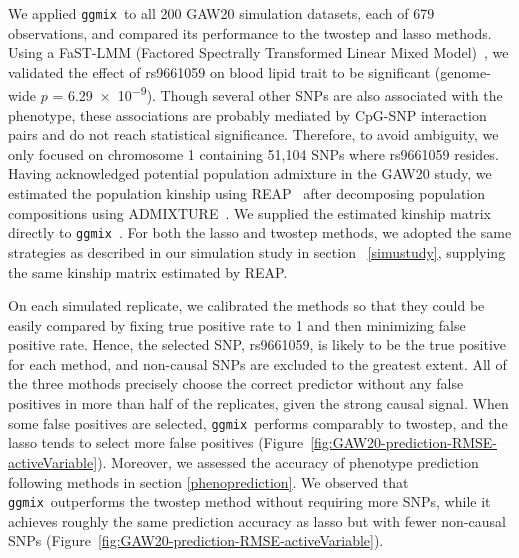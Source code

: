 \documentclass[12pt,letter]{article}\usepackage[]{graphicx}\usepackage[]{color}
\newcommand{\ggmix}{\texttt{ggmix}}
\begin{document}
We applied \ggmix ~to all 200 GAW20 simulation datasets, each of 679 observations, and compared its performance to the twostep and lasso methods.
Using a FaST-LMM (Factored Spectrally Transformed Linear Mixed Model)~\citep{howey2018application}, we validated the effect of rs9661059 on blood lipid trait to be significant (genome-wide $p$ = \num{6.29e-9}).
Though several other SNPs are also associated with the phenotype, these associations are probably mediated by CpG-SNP interaction pairs and do not reach statistical significance.
Therefore, to avoid ambiguity, we only focused on chromosome 1 containing 51,104 SNPs where rs9661059 resides.
Having acknowledged potential population admixture in the GAW20 study, we estimated the population kinship using REAP~\citep{thornton2012estimating} after decomposing population compositions using ADMIXTURE~\citep{alexander2009fast}. We supplied the estimated kinship matrix directly to \ggmix~.
For both the lasso and twostep methods, we adopted the same strategies as described in our simulation study in section ~\ref{simustudy}, supplying the same kinship matrix estimated by REAP.

On each simulated replicate, we calibrated the methods so that they could be easily compared by fixing true positive rate to 1 and then minimizing false positive rate. Hence, the selected SNP, rs9661059, is likely to be the true positive for each method, and non-causal SNPs are excluded to the greatest extent.
All of the three mothods precisely choose the correct predictor without any false positives in more than half of the replicates, given the strong causal signal. When some false positives are selected, \ggmix ~performs comparably to twostep, and the lasso tends to select more false positives (Figure~\ref{fig:GAW20-prediction-RMSE-activeVariable}).
Moreover, we assessed the accuracy of phenotype prediction following methods in section \ref{phenoprediction}. We observed that \ggmix ~outperforms the twostep method without requiring more SNPs, while it achieves roughly the same prediction accuracy as lasso but with fewer non-causal SNPs (Figure~\ref{fig:GAW20-prediction-RMSE-activeVariable}).
\end{document}
